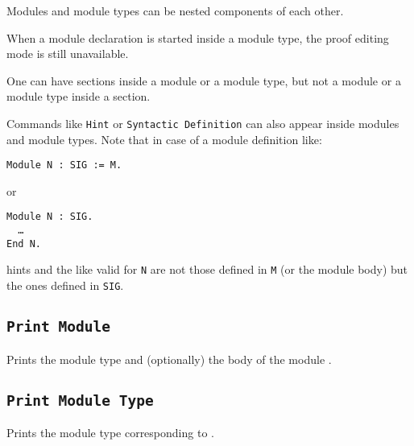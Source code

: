 \begin{Remarks}
\item Modules and module types can be nested components of each other.
\item When a module declaration is started inside a module type,
  the proof editing mode is still unavailable.
\item One can have sections inside a module or a module type, but
  not a module or a module type inside a section.
\item Commands like \texttt{Hint} or \texttt{Syntactic Definition} can
  also appear inside modules and module types. Note that in case of a
  module definition like:

    \medskip
    \noindent
    {\tt Module N : SIG := M.} 
    \medskip

    or

    \medskip
    {\tt Module N : SIG.\\
      \ \ \dots\\
      End N.}
    \medskip 
    
    hints and the like valid for \texttt{N} are not those defined in
    \texttt{M} (or the module body) but the ones defined in
    \texttt{SIG}.

\end{Remarks}

\subsection{\tt Print Module {\ident}}
Prints the module type and (optionally) the body of the module {\ident}.

\subsection{\tt Print Module Type {\ident}}
Prints the module type corresponding to {\ident}.



